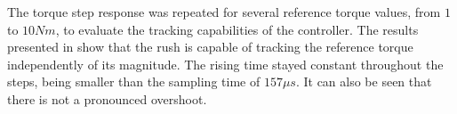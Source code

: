 The torque step response was repeated for several reference torque values, from $1$ to $10Nm$, to evaluate the tracking capabilities of the controller. The results presented in  show that the \gls{rush} is capable of tracking the reference torque independently of its magnitude. The rising time stayed constant throughout the steps, being smaller than the sampling time of $157\mu s$. It can also be seen that there is not a pronounced overshoot. 

\begin{figure}[!htb]
	\centering
	\begin{subfigmatrix}{3}
	\end{subfigmatrix}
	\begin{subfigmatrix}{3}

\end{subfigmatrix}
\end{figure}
